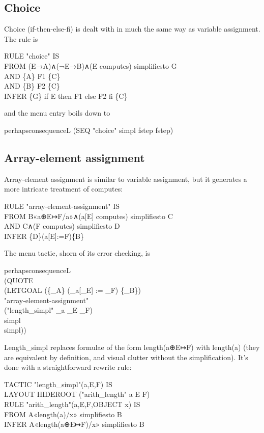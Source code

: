 \subsection{Choice}

Choice (if-then-else-fi) is dealt with in much the same way as variable assignment. The rule is
\begin{japeish}
RULE "choice" IS \\
\tab FROM (E→A)∧(¬E→B)∧(E computes) simplifiesto G  \\
\tab AND \{A\} F1 \{C\}  \\
\tab AND \{B\} F2 \{C\}  \\
\tab INFER \{G\} if E then F1 else F2 fi \{C\}
\end{japeish}
and the menu entry boils down to
\begin{japeish}
perhapsconsequenceL (SEQ "choice" simpl fstep fstep)
\end{japeish}

\subsection{Array-element assignment}
\label{sec:Hoare:arrayelementassignment}

Array-element assignment is similar to variable assignment, but it generates a more intricate treatment of computes:
\begin{japeish}
RULE "array-element-assignment" IS  \\
\tab FROM B«a⊕E↦F/a»∧(a[E] computes) simplifiesto C  \\
\tab AND C∧(F computes) simplifiesto D \\
\tab INFER \{D\}(a[E]:=F)\{B\}
\end{japeish}
The menu tactic, shorn of its error checking, is
\begin{japeish}
perhapsconsequenceL \\
\tab (QUOTE \\
\tab \tab (LETGOAL (\{\_A\} (\_a[\_E] := \_F) \{\_B\}) \\
\tab \tab \tab "array-element-assignment" \\
\tab \tab \tab ("length\_simpl" \_a \_E \_F) \\
\tab \tab \tab simpl \\
\tab \tab \tab simpl))
\end{japeish}
Length\_simpl replaces formulae of the form length(a⊕E↦F) with length(a) (they are equivalent by definition, and visual clutter without the simplification). It's done with a straightforward rewrite rule:
\begin{japeish}
TACTIC "length\_simpl"(a,E,F) IS \\
\tab LAYOUT HIDEROOT ("arith\_length" a E F) \\
RULE "arith\_length"(a,E,F,OBJECT x) IS \\
\tab FROM A«length(a)/x» simplifiesto B \\
\tab INFER A«length(a⊕E↦F)/x» simplifiesto B
\end{japeish}

